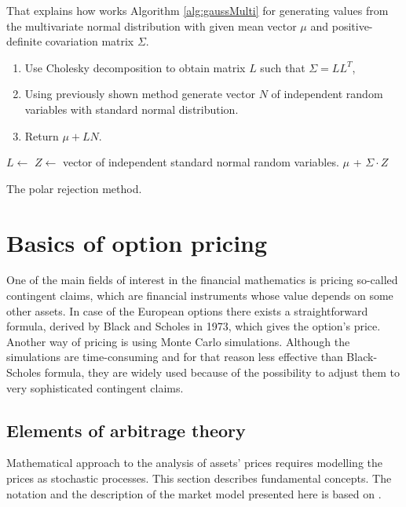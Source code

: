 \documentclass[a4paper,11pt, twoside]{book}
\theoremstyle{definition}
\theoremstyle{remark}
\begin{document}
That explains how works Algorithm \ref{alg:gaussMulti} for generating values from the multivariate normal distribution with given mean vector $\mu$ and positive-definite covariation matrix $\Sigma$. 
\begin{enumerate}
 \item Use Cholesky decomposition to obtain matrix $L$ such that $\Sigma = LL^T$,
 \item Using previously shown method generate vector $N$ of independent random variables with standard normal distribution.
 \item Return $\mu + LN$.
\end{enumerate}
\begin{algorithm}[!ht]
 \begin{algorithmic}[1]
    \State $L \gets $ 
    \State $Z \gets $ vector of independent standard normal random variables.
    \State {}
    \State \Return $\mu$ + $\Sigma \cdot Z$
  \EndFunction
 \end{algorithmic}
 \caption{The polar rejection method.}
 \label{alg:gaussMulti}
\end{algorithm}


\chapter{Basics of option pricing}
One of the main fields of interest in the financial mathematics is pricing so-called contingent claims, which are financial instruments whose value depends on some other assets. In case of the European options there exists a straightforward formula, derived by Black and Scholes in 1973, which gives the option's price. Another way of pricing is using Monte Carlo simulations.
Although the simulations are time-consuming and for that reason less effective than Black-Scholes formula, they are widely used because of the possibility to adjust them to very sophisticated contingent claims. 

\section{Elements of arbitrage theory}
Mathematical approach to the analysis of assets' prices requires modelling the prices as stochastic processes. This section describes fundamental concepts. The notation and the description of the market model presented here is based on \cite{follmer}.
\end{document}
